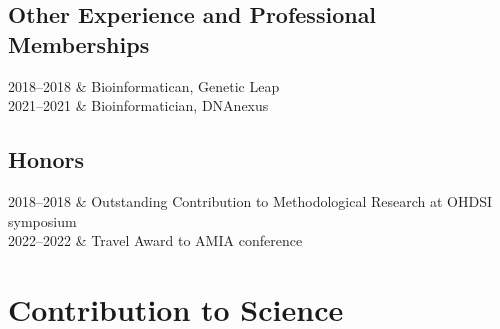 \documentclass{nihbiosketch}
\begin{document}
\subsection*{Other Experience and Professional
Memberships}\label{other-experience-and-professional-memberships}

\begin{datetbl}
2018--2018 & Bioinformatican, Genetic Leap \\
2021--2021 & Bioinformatician, DNAnexus \\
\end{datetbl}

\subsection*{Honors}\label{honors}

\begin{datetbl}
2018--2018 & Outstanding Contribution to Methodological Research at OHDSI symposium \\
2022--2022 & Travel Award to AMIA conference \\
\end{datetbl}

\section*{Contribution to Science}\label{contribution-to-science}
\end{document}
